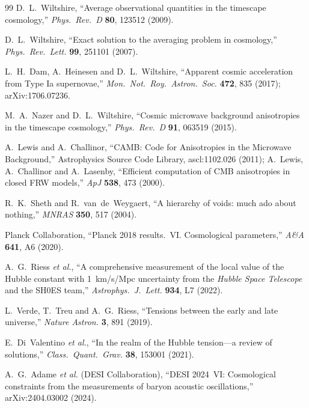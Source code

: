 \documentclass[aps,prd,twocolumn,nofootinbib,floatfix,superscriptaddress]{revtex4-2}
\begin{document}
\begin{thebibliography}{99}
 D.~L.~Wiltshire, ``Average observational
quantities in the timescape cosmology,'' \textit{Phys.~Rev.~D}
\textbf{80}, 123512 (2009).

 D.~L.~Wiltshire, ``Exact solution to the
averaging problem in cosmology,'' \textit{Phys.~Rev.~Lett.}
\textbf{99}, 251101 (2007).

 L.~H.~Dam, A.~Heinesen and D.~L.~Wiltshire,
``Apparent cosmic acceleration from Type Ia supernovae,''
\textit{Mon.~Not.~Roy.~Astron.~Soc.} \textbf{472}, 835 (2017);
arXiv:1706.07236.

 M.~A.~Nazer and D.~L.~Wiltshire, ``Cosmic
microwave background anisotropies in the timescape cosmology,''
\textit{Phys.~Rev.~D} \textbf{91}, 063519 (2015).

 A.~Lewis and A.~Challinor, ``CAMB: Code
for Anisotropies in the Microwave Background,'' Astrophysics Source
Code Library, ascl:1102.026 (2011); A.~Lewis, A.~Challinor and
A.~Lasenby, ``Efficient computation of CMB anisotropies in closed FRW
models,'' \textit{ApJ} \textbf{538}, 473 (2000).

 R.~K.~Sheth and R.~van~de~Weygaert, ``A hierarchy
of voids: much ado about nothing,''
\textit{MNRAS} \textbf{350}, 517 (2004).


 Planck Collaboration, ``Planck 2018 results.~VI.
Cosmological parameters,'' \textit{A\&A} \textbf{641}, A6 (2020).

 A.~G.~Riess \emph{et al.}, ``A comprehensive
measurement of the local value of the Hubble constant with
1~km/s/Mpc uncertainty from the {\it Hubble Space Telescope} and the
SH0ES team,'' \textit{Astrophys.~J.~Lett.} \textbf{934}, L7 (2022).

 L.~Verde, T.~Treu and A.~G.~Riess,
``Tensions between the early and late universe,''
\textit{Nature Astron.} \textbf{3}, 891 (2019).

 E.~Di~Valentino \emph{et al.}, ``In the
realm of the Hubble tension---a review of solutions,''
\textit{Class.~Quant.~Grav.} \textbf{38}, 153001 (2021).

 A.~G.~Adame \emph{et al.} (DESI Collaboration),
``DESI 2024~VI: Cosmological constraints from the measurements of
baryon acoustic oscillations,'' arXiv:2404.03002 (2024).


\end{thebibliography}
\end{document}
